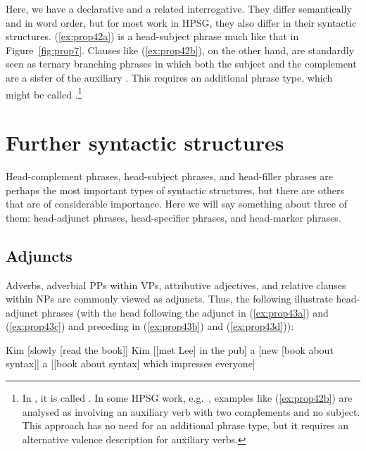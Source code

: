 \documentclass[output=paper,biblatex,babelshorthands,newtxmath,draftmode,colorlinks,citecolor=brown]{langscibook}
\begin{document}
\noindent
Here, we have a declarative and a related interrogative. They differ semantically and in word order,
but for most work in HPSG, they also differ in their syntactic structures. (\ref{ex:prop42a}) is a
head-subject phrase much like that in Figure~\ref{fig:prop7}. Clauses like (\ref{ex:prop42b}), on
the other hand, are standardly seen as ternary branching phrases in which both the subject and the
complement are a sister of the auxiliary \citep[40]{ps2}. This requires an additional phrase type,
which might be called .\footnote{In \citet[36]{GSag2000a-u}, it
  is called . In some HPSG work, e.g.\ \citet[409--414]{SWB2003a}, examples like
  (\ref{ex:prop42b}) are analysed as involving an auxiliary verb with two complements and no
  subject. This approach has no need for an additional phrase type, but it requires an alternative
  valence description for auxiliary verbs.}
%


\section{Further syntactic structures}\label{sec:prop6}
\label{prop:sec-further-syntactic-structures}

Head-complement phrases, head-subject phrases, and head-filler phrases are perhaps the most important types of syntactic structures, but there are others that are of considerable importance. Here we will say something about three of them: head-adjunct phrases, head-specifier phrases, and head-marker phrases.

\largerpage
\subsection{Adjuncts}\label{sec:prop6.1}
\label{properties:sec-adjuncts}

Adverbs, adverbial PPs within VPs, attributive adjectives, and relative clauses within NPs are commonly viewed as adjuncts. Thus, the following illustrate head-adjunct phrases (with the head following the adjunct in (\ref{ex:prop43a}) and (\ref{ex:prop43c}) and preceding in (\ref{ex:prop43b}) and (\ref{ex:prop43d})):

\eal\label{ex:prop43}
\ex\label{ex:prop43a}
Kim [slowly [read the book]]
\ex\label{ex:prop43b}
Kim [[met Lee] in the pub]
\ex\label{ex:prop43c}
a [new [book about syntax]]
\ex\label{ex:prop43d}\label{ex-book-which-impresses}
a [[book about syntax] which impresses everyone]
\zl
\end{document}
